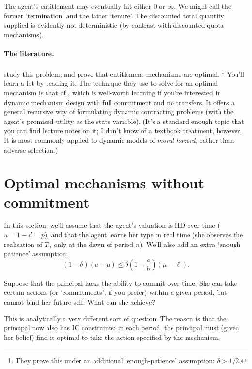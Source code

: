 The agent's entitlement may eventually hit either $0$ or $\infty$.
We might call the former `termination'
and the latter `tenure'.
The discounted total quantity supplied is evidently not deterministic (by contrast with discounted-quota mechanisms).


\paragraph{The literature.}
\textcite{GuoHorner2020} study this problem, and prove that entitlement mechanisms are optimal.%
	\footnote{They prove this under an additional `enough-patience' assumption: $\delta > 1/2$.}
You'll learn a lot by reading it.
The technique they use to solve for an optimal mechanism is that of \textcite{SpearSrivastava1987}, which is well-worth learning if you're interested in dynamic mechanism design with full commitment and no transfers.
It offers a general recursive way of formulating dynamic contracting problems (with the agent's promised utility as the state variable).
(It's a standard enough topic that you can find lecture notes on it; I don't know of a textbook treatment, however. It is most commonly applied to dynamic models of \emph{moral hazard,} rather than adverse selection.)



\section{Optimal mechanisms without commitment}
\label{sec:ch3:nocommitment}

In this section, we'll assume that the agent's valuation is IID over time ($u = 1-d = p$),
and that the agent learns her type in real time (she observes the realisation of $T_n$ only at the dawn of period $n$).
We'll also add an extra `enough patience' assumption:
%
\begin{equation*}
	(1-\delta) (c-\mu)
	\leq \delta \left( 1 - \frac{c}{h} \right) \left( \mu - \ell \right) .
\end{equation*}

Suppose that the principal lacks the ability to commit over time.
She can take certain actions (or `commitments', if you prefer) within a given period, but cannot bind her future self.
What can she achieve?

This is analytically a very different sort of question. The reason is that the principal now also has IC constraints: in each period, the principal must (given her belief) find it optimal to take the action specified by the mechanism.

